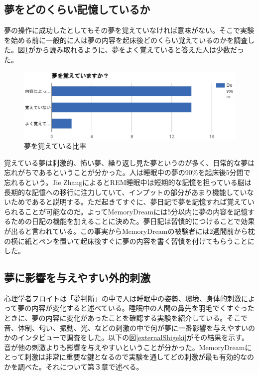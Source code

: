 \subsection{夢をどのくらい記憶しているか}
夢の操作に成功したとしてもその夢を覚えていなければ意味がない。そこで実験を始める前に一般的に人は夢の内容を起床後どのくらい覚えているのかを調査した。図\ref{rememberDream}がから読み取れるように、夢をよく覚えていると答えた人は少数だった。

\begin{figure}[htbp]
\begin{center}
\includegraphics[width=15cm]{eps/remember.eps}
\caption{夢を覚えている比率}
\label{rememberDream}
\end{center}
\end{figure}

覚えている夢は刺激的、怖い夢、繰り返し見た夢というのが多く、日常的な夢は忘れがちであるということが分かった。人は睡眠中の夢の90\%を起床後5分間で忘れるという。Jie ZhangによるとREM睡眠中は短期的な記憶を担っている脳は長期的な記憶への移行に注力していて、インプットの部分があまり機能していないためであると説明する。ただ起きてすぐに、夢日記で夢を記憶すれば覚えていられることが可能なのだ\cite{forgetDreams}。よってMemoryDreamには5分以内に夢の内容を記憶するための日記の機能を加えることに決めた。夢日記は習慣的につけることで効果が出ると言われている。この事実からMemoryDreamの被験者には2週間前から枕の横に紙とペンを置いて起床後すぐに夢の内容を書く習慣を付けてもらうことにした。

\subsection{夢に影響を与えやすい外的刺激}
心理学者フロイトは「夢判断」の中で人は睡眠中の姿勢、環境、身体的刺激によって夢の内容が変化すると述べている\cite{freud}。睡眠中の人間の鼻先を羽毛でくすぐったときに、夢の内容に変化があったことを確認する実験を紹介している。そこで音、体制、匂い、振動、光、などの刺激の中で何が夢に一番影響を与えやすいのかのインタビューで調査をした。以下の図\ref{externalShigeki}がその結果を示す。音が他の刺激よりも影響を与えやすいということが分かった。MemoryDreamにとって刺激は非常に重要な鍵となるので実験を通してどの刺激が最も有効的なのかを調べた。それについて第３章で述べる。

